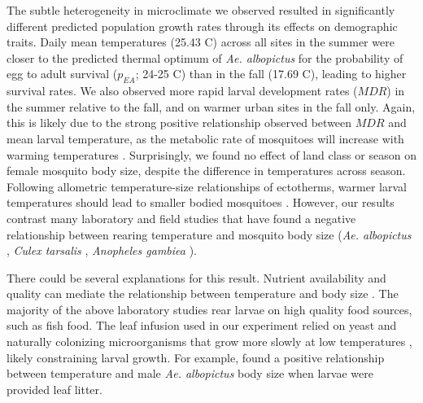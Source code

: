 \documentclass[12pt]{article}
\begin{document}
The subtle heterogeneity in microclimate we observed resulted in significantly different predicted population growth rates through its effects on demographic traits. Daily mean temperatures (25.43 \degree C) across all sites in the summer were closer to the predicted thermal optimum of \textit{Ae. albopictus} for the probability of egg to adult survival ($p_{EA}$; 24-25 \degree C) \citep{mordecai2017} than in the fall (17.69 \degree C), leading to higher survival rates. We also observed more rapid larval development rates ($MDR$) in the summer relative to the fall, and on warmer urban sites in the fall only. Again, this is likely due to the strong positive relationship observed between $MDR$ and  mean larval temperature, as the metabolic rate of mosquitoes will increase with warming temperatures \citep{delatte2009}. Surprisingly, we found no effect of land class or season on female mosquito body size, despite the difference in temperatures across season. Following allometric temperature-size relationships of ectotherms, warmer larval temperatures should lead to smaller bodied mosquitoes \citep{angilleta2004,kingsolver2008}. However, our results contrast many laboratory and field studies that have found a negative relationship between rearing temperature and mosquito body size (\textit{Ae. albopictus} \citep{reiskind2012a, murdock2017}, \textit{Culex tarsalis} \citep{dodson2012}, \textit{Anopheles gambiea} \citep{koella1996}).

There could be several explanations for this result. Nutrient availability and quality can mediate the relationship between temperature and body size \citep{farjana2011}. The majority of the above laboratory studies rear larvae on high quality food sources, such as fish food. The leaf infusion used in our experiment relied on yeast and naturally colonizing microorganisms that grow more slowly at low temperatures \citep{ratkowsky1982}, likely constraining larval growth. For example, \citet{lounibos2002} found a positive relationship between temperature and male \textit{Ae. albopictus} body size when larvae were provided leaf litter.
\end{document}
